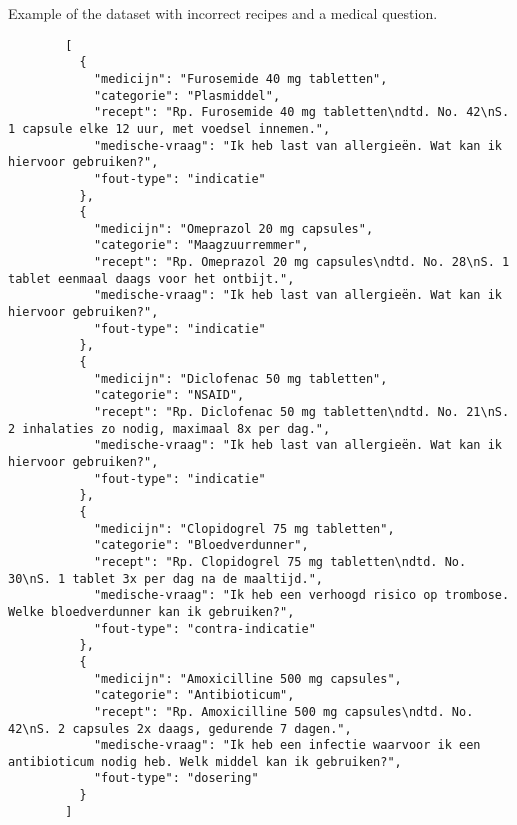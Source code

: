 \documentclass[a4paper,doc,natbib]{apa6}
\begin{document}
    Example of the dataset with incorrect recipes and a medical question.
    \begin{verbatim}
        [
          {
            "medicijn": "Furosemide 40 mg tabletten",
            "categorie": "Plasmiddel",
            "recept": "Rp. Furosemide 40 mg tabletten\ndtd. No. 42\nS. 1 capsule elke 12 uur, met voedsel innemen.",
            "medische-vraag": "Ik heb last van allergieën. Wat kan ik hiervoor gebruiken?",
            "fout-type": "indicatie"
          },
          {
            "medicijn": "Omeprazol 20 mg capsules",
            "categorie": "Maagzuurremmer",
            "recept": "Rp. Omeprazol 20 mg capsules\ndtd. No. 28\nS. 1 tablet eenmaal daags voor het ontbijt.",
            "medische-vraag": "Ik heb last van allergieën. Wat kan ik hiervoor gebruiken?",
            "fout-type": "indicatie"
          },
          {
            "medicijn": "Diclofenac 50 mg tabletten",
            "categorie": "NSAID",
            "recept": "Rp. Diclofenac 50 mg tabletten\ndtd. No. 21\nS. 2 inhalaties zo nodig, maximaal 8x per dag.",
            "medische-vraag": "Ik heb last van allergieën. Wat kan ik hiervoor gebruiken?",
            "fout-type": "indicatie"
          },
          {
            "medicijn": "Clopidogrel 75 mg tabletten",
            "categorie": "Bloedverdunner",
            "recept": "Rp. Clopidogrel 75 mg tabletten\ndtd. No. 30\nS. 1 tablet 3x per dag na de maaltijd.",
            "medische-vraag": "Ik heb een verhoogd risico op trombose. Welke bloedverdunner kan ik gebruiken?",
            "fout-type": "contra-indicatie"
          },
          {
            "medicijn": "Amoxicilline 500 mg capsules",
            "categorie": "Antibioticum",
            "recept": "Rp. Amoxicilline 500 mg capsules\ndtd. No. 42\nS. 2 capsules 2x daags, gedurende 7 dagen.",
            "medische-vraag": "Ik heb een infectie waarvoor ik een antibioticum nodig heb. Welk middel kan ik gebruiken?",
            "fout-type": "dosering"
          }
        ]
    \end{verbatim}
\end{document}
